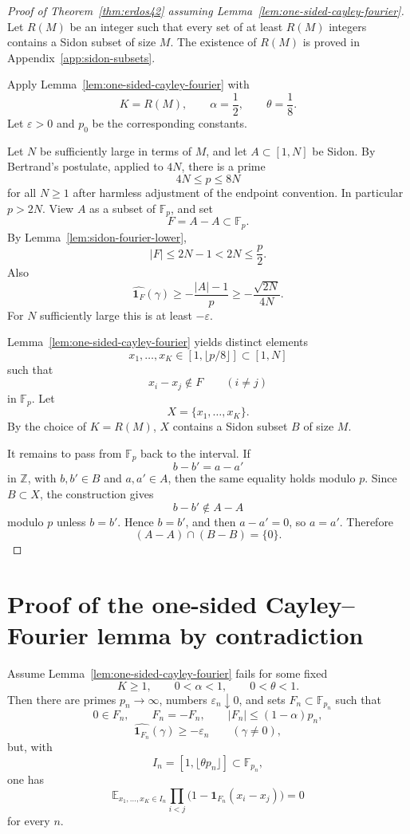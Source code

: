 \documentclass[11pt]{article}
\numberwithin{equation}{section}
\newcommand{\E}{\mathbb E}
\newcommand{\F}{\mathbb F}
\newcommand{\Z}{\mathbb Z}
\newcommand{\1}{\mathbf 1}
\begin{document}
\begin{proof}[Proof of Theorem~\ref{thm:erdos42} assuming
Lemma~\ref{lem:one-sided-cayley-fourier}]
Let \(R(M)\) be an integer such that every set of at least \(R(M)\)
integers contains a Sidon subset of size \(M\).  The existence of \(R(M)\)
is proved in Appendix~\ref{app:sidon-subsets}.

Apply Lemma~\ref{lem:one-sided-cayley-fourier} with
\[
        K=R(M),\qquad \alpha=\frac12,\qquad \theta=\frac18.
\]
Let \(\varepsilon>0\) and \(p_0\) be the corresponding constants.

Let \(N\) be sufficiently large in terms of \(M\), and let
\(A\subset[1,N]\) be Sidon.  By Bertrand's postulate, applied to \(4N\),
there is a prime
\[
        4N\le p\le 8N
\]
for all \(N\ge1\) after harmless adjustment of the endpoint convention.
In particular \(p>2N\).  View \(A\) as a subset of \(\F_p\), and set
\[
        F=A-A\subset\F_p.
\]
By Lemma~\ref{lem:sidon-fourier-lower},
\[
        |F|\le 2N-1<2N\le\frac p2.
\]
Also
\[
        \widehat{\1_F}(\gamma)
        \ge
        -\frac{|A|-1}{p}
        \ge
        -\frac{\sqrt{2N}}{4N}.
\]
For \(N\) sufficiently large this is at least \(-\varepsilon\).

Lemma~\ref{lem:one-sided-cayley-fourier} yields distinct elements
\[
        x_1,\ldots,x_K\in [1,\lfloor p/8\rfloor]\subset[1,N]
\]
such that
\[
        x_i-x_j\notin F
        \qquad(i\ne j)
\]
in \(\F_p\).  Let
\[
        X=\{x_1,\ldots,x_K\}.
\]
By the choice of \(K=R(M)\), \(X\) contains a Sidon subset \(B\) of size
\(M\).

It remains to pass from \(\F_p\) back to the interval.  If
\[
        b-b'=a-a'
\]
in \(\Z\), with \(b,b'\in B\) and \(a,a'\in A\), then the same equality
holds modulo \(p\).  Since \(B\subset X\), the construction gives
\[
        b-b'\notin A-A
\]
modulo \(p\) unless \(b=b'\).  Hence \(b=b'\), and then \(a-a'=0\), so
\(a=a'\).  Therefore
\[
        (A-A)\cap(B-B)=\{0\}.
\]
\end{proof}

\section{Proof of the one-sided Cayley--Fourier lemma by contradiction}

Assume Lemma~\ref{lem:one-sided-cayley-fourier} fails for some fixed
\[
        K\ge1,\qquad 0<\alpha<1,\qquad 0<\theta<1.
\]
Then there are primes \(p_n\to\infty\), numbers
\(\varepsilon_n\downarrow0\), and sets \(F_n\subset\F_{p_n}\) such that
\[
        0\in F_n,\qquad F_n=-F_n,\qquad |F_n|\le(1-\alpha)p_n,
\]
\[
        \widehat{\1_{F_n}}(\gamma)\ge-\varepsilon_n
        \qquad(\gamma\ne0),
\]
but, with
\[
        I_n=[1,\lfloor\theta p_n\rfloor]\subset\F_{p_n},
\]
one has
\[
        \E_{x_1,\ldots,x_K\in I_n}
        \prod_{i<j}
        \bigl(1-\1_{F_n}(x_i-x_j)\bigr)=0
\]
for every \(n\).
\end{document}

